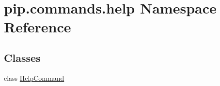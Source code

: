 \hypertarget{namespacepip_1_1commands_1_1help}{}\section{pip.\+commands.\+help Namespace Reference}
\label{namespacepip_1_1commands_1_1help}
\subsection*{Classes}
\begin{DoxyCompactItemize}
\item 
class \hyperlink{classpip_1_1commands_1_1help_1_1_help_command}{Help\+Command}
\end{DoxyCompactItemize}
